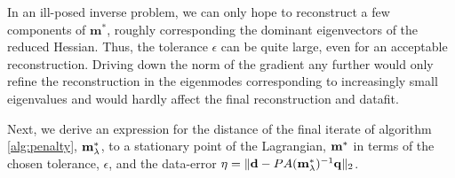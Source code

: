 \documentclass{iopart}
\begin{document}
In an ill-posed inverse problem, we can only hope to reconstruct a few components of $\mathbf{m}^*$, roughly corresponding the dominant eigenvectors of the reduced Hessian. Thus, the tolerance $\epsilon$ can be quite large, even for an acceptable reconstruction. Driving down the norm of the gradient any further would only refine the reconstruction in the eigenmodes corresponding to increasingly small eigenvalues and would hardly affect the final reconstruction and datafit. 

Next, we derive an expression for the distance of the final iterate of algorithm \ref{alg:penalty}, $\mathbf{m}^*_{\lambda}$, to a stationary point of the Lagrangian, $\mathbf{m}^*$ in terms of the chosen tolerance, $\epsilon$, and the data-error $\eta = \|\mathbf{d} - PA(\mathbf{m}^*_{\lambda})^{-1}\mathbf{q}\|_2$. 
\end{document}

